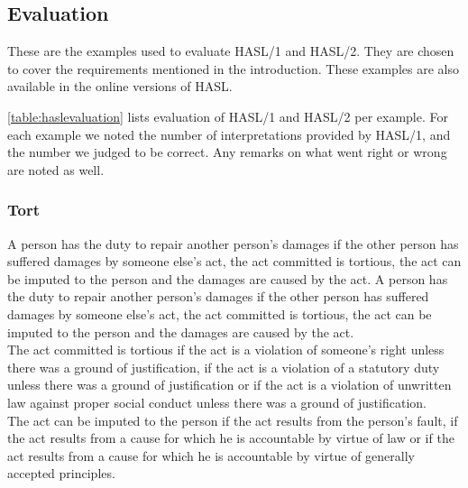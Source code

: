 \subsection{Evaluation}
\label{sec:appevaluation}
These are the examples used to evaluate HASL/1 and HASL/2. They are chosen to cover the requirements mentioned in the introduction. These examples are also available in the online versions of HASL.

\autoref{table:haslevaluation} lists evaluation of HASL/1 and HASL/2 per example. For each example we noted the number of interpretations provided by HASL/1, and the number we judged to be correct. Any remarks on what went right or wrong are noted as well.

\subsubsection{Tort}
\begin{exe}
\ex\label{e126} A person has the duty to repair another person's damages if the other person has suffered damages by someone else's act, the act committed is tortious, the act can be imputed to the person and the damages are caused by the act.
\ex\label{e127} A person has the duty to repair another person's damages if the other person has suffered damages by someone else's act, the act committed is tortious, the act can be imputed to the person and the damages are caused by the act.\\ The act committed is tortious if the act is a violation of someone’s right unless there was a ground of justification, if the act is a violation of a statutory duty unless there was a ground of justification or if the act is a violation of unwritten law against proper social conduct unless there was a ground of justification.\\ The act can be imputed to the person if the act results from the person's fault, if the act results from a cause for which he is accountable by virtue of law or if the act results from a cause for which he is accountable by virtue of generally accepted principles.
\end{exe}

\clearpage